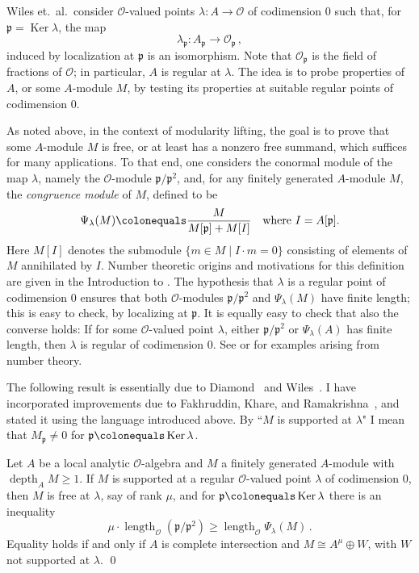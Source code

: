 \documentclass[twoside,leqno]{article}
\newcommand{\cmod}{\Psi}
\newcommand{\depth}{\operatorname{depth}}
\newcommand{\fp}{{\mathfrak p}}
\newcommand{\Ker}{\operatorname{Ker}}
\newcommand{\length}{\operatorname{length}}
\newcommand{\mco}{\mathcal O}
\begin{document}
Wiles et.~al.\ consider $\mco$-valued points $\lambda\colon A\to \mco$ of codimension $0$ such that, for $\fp=\Ker \lambda$, the map 
\[
\lambda_\fp \colon A_\fp \longrightarrow \mco_\fp\,,
\]
induced by localization at $\fp$ is an isomorphism. Note that $\mco_\fp$ is the field of fractions of $\mco$; in particular, $A$ is regular at $\lambda$. The idea is to probe properties of $A$, or some $A$-module $M$, by testing its properties at suitable regular points of codimension $0$. 

As noted above, in the context of modularity lifting, the goal is to prove that some $A$-module $M$ is free, or at least has a nonzero free summand, which suffices for many applications. To that end, one considers the conormal  module of the map $\lambda$, namely the $\mco$-module $\fp/\fp^2$, and, for any finitely generated $A$-module $M$, the \emph{congruence module} of $M$, defined to be
\begin{equation}
\label{eq:cmod0}
\cmod_\lambda(M)\colonequals \frac{M}{M[\fp]+M[I]} \quad \text{where $I=A[\fp]$.}    
\end{equation}
Here $M[I]$ denotes the submodule $\{m\in M\mid I\cdot m=0\}$ consisting of elements of $M$ annihilated by $I$. Number theoretic origins and motivations for this definition are given in the Introduction to \cite{Iyengar/Khare/Manning:2025a}. The hypothesis that $\lambda$ is a regular point of codimension 0 ensures that both $\mco$-modules $\fp/\fp^2$ and $\cmod_\lambda(M)$ have finite length; this is easy to check, by localizing at $\fp$. It is equally easy to check that also the converse holds: If for some $\mco$-valued point $\lambda$, either $\fp/\fp^2$ or $\cmod_\lambda(A)$ has finite length, then $\lambda$ is regular of codimension $0$. See \cite[\S5.1]{Darmon/Diamond/Taylor:1997} or \cite[Example~2.7]{Iyengar/Khare/Manning:2025a} for examples arising from number theory.

The following result is essentially due to Diamond~\cite{Diamond:1997} and Wiles~\cite{Wiles:1995}. I have incorporated improvements due to Fakhruddin, Khare, and Ramakrishna~\cite[Appendix]{Fakhruddin/Khare/Ramakrishna:2021}, and stated it using the language introduced above.
By ``$M$ is supported at $\lambda$" I mean that $M_\fp\ne 0$ for $\fp\colonequals \Ker\lambda$.

 \begin{theorem}
     \label{th:diamond}
Let $A$ be a local analytic $\mco$-algebra and $M$ a finitely generated $A$-module with $\depth_AM\ge 1$.
If $M$ is supported at a regular $\mco$-valued point  $\lambda$ of codimension $0$,  then $M$ is free at $\lambda$, say of rank $\mu$, and for $\fp\colonequals \Ker\lambda$ there is an inequality
\[
\mu\cdot \length_\mco (\fp/\fp^2) \ge \length_\mco \cmod_\lambda(M)\,.
\]
Equality holds if and only if $A$ is complete intersection and $M\cong A^\mu\oplus W$, with $W$  not supported at $\lambda$. \qed
 \end{theorem}
\end{document}
